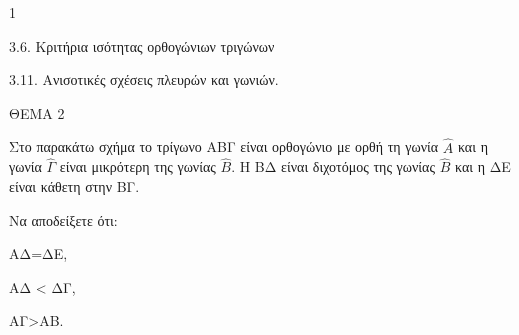 \begin{ylh}{1}
    \item 3.6. Κριτήρια ισότητας ορθογώνιων τριγώνων
    \item 3.11. Ανισοτικές σχέσεις πλευρών και γωνιών.
\end{ylh}

ΘΕΜΑ 2

Στο παρακάτω σχήμα το τρίγωνο ΑΒΓ είναι ορθογώνιο με ορθή τη γωνία $\widehat{Α}$ και η γωνία $\widehat{\Gamma}$ είναι μικρότερη της γωνίας $\widehat{Β}$. Η ΒΔ είναι διχοτόμος της γωνίας $\widehat{Β}$ και η ΔΕ είναι κάθετη στην ΒΓ.

Να αποδείξετε ότι:

\begin{alist}
\item ΑΔ=ΔΕ, 

\item ΑΔ \textless{} ΔΓ, 

\item ΑΓ\textgreater ΑΒ. 


\begin{center}
\end{center}
\end{alist}
